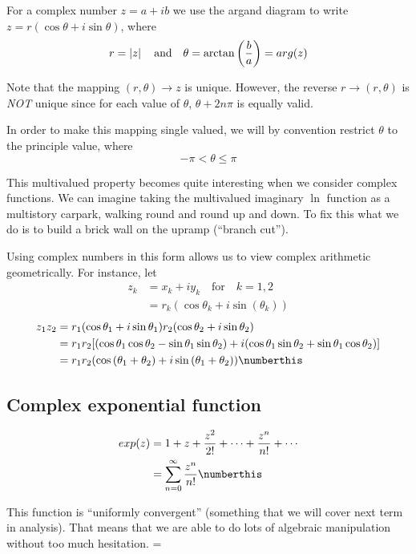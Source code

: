 \documentclass{article}
\numberwithin{equation}{section}
\begin{document}
\begin{defi}
    For a complex number $z = a + ib$ we use the argand diagram to write $z = r(\cos{\theta} + i\sin{\theta})$, where
    \[
        r = \left\lvert z\right\rvert \quad \text{and} \quad \theta = \arctan\left(\frac{b}{a}\right) = arg(z)  
    \]
\end{defi}

\begin{remark}
    Note that the mapping $(r, \theta) \rightarrow z$ is unique. However, the reverse $r \rightarrow (r, \theta)$ is \emph{NOT} unique since for each value of $\theta$, $\theta + 2n\pi$ is equally valid.

    In order to make this mapping single valued, we will by convention restrict $\theta$ to the principle value, where
    \[
        -\pi < \theta \leq \pi  
    \]

    This multivalued property becomes quite interesting when we consider complex functions. We can imagine taking the multivalued imaginary $\ln$ function as a multistory carpark, walking round and round up and down. To fix this what we do is to build a brick wall on the upramp (``branch cut'').
\end{remark}

Using complex numbers in this form allows us to view complex arithmetic geometrically. For instance, let
\begin{align*}
    z_k &= x_k + iy_k \quad \text{for} \quad k = 1, 2 \\
    &= r_k(\cos{\theta_k} + i\sin(\theta_k))
\end{align*}
\begin{align*}
    z_1z_2 &= r_1(\cos{\theta_1} + i\sin{\theta_1})r_2(\cos{\theta_2} + i\sin{\theta_2}) \\
    &= r_1r_2[(\cos{\theta_1}\cos{\theta_2} - \sin{\theta_1}\sin{\theta_2}) + i(\cos{\theta_1}\sin{\theta_2} + \sin{\theta_1}\cos{\theta_2})] \\
    &= r_1r_2(\cos{(\theta_1 + \theta_2)} + i\sin{(\theta_1 + \theta_2)}) \numberthis \label{eq:4}
\end{align*}

\subsection{Complex exponential function}
\begin{defi}
    \begin{align*}
        exp(z) &= 1 + z + \frac{z^2}{2!} + \cdots + \frac{z^n}{n!} + \cdots \\
        &=\sum_{n=0}^{\infty}{\frac{z^n}{n!}} \numberthis \label{eq:5}
    \end{align*}
\end{defi}
This function is ``uniformly convergent'' (something that we will cover next term in analysis). That means that we are able to do lots of algebraic manipulation without too much hesitation. =
\end{document}
